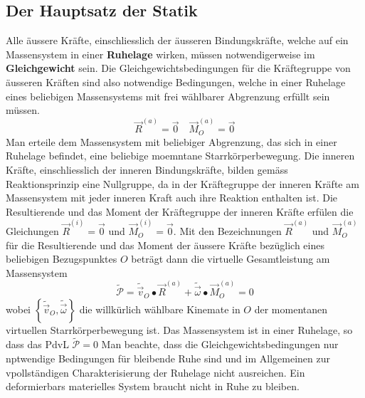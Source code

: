 \subsection{Der Hauptsatz der Statik}
Alle äussere Kräfte, einschliesslich der äusseren Bindungskräfte, welche auf ein Massensystem in einer \textbf{Ruhelage} wirken, müssen notwendigerweise im \textbf{Gleichgewicht} sein. Die Gleichgewichtsbedingungen für die Kräftegruppe von äusseren Kräften sind also notwendige Bedingungen, welche in einer Ruhelage eines beliebigen Massensystems mit frei wählbarer Abgrenzung erfüllt sein müssen.
\begin{equation} 
\boxed{\overrightarrow{R}^{\left(a\right)}=\overrightarrow{0}}\quad \boxed{\overrightarrow{M}_O^{\left(a\right)}=\overrightarrow{0}}
\end{equation} 
Man erteile dem Massensystem mit beliebiger Abgrenzung, das sich in einer Ruhelage befindet, eine beliebige moemntane Starrkörperbewegung. Die inneren Kräfte, einschliesslich der inneren Bindungskräfte, bilden gemäss Reaktionsprinzip eine Nullgruppe, da in der Kräftegruppe der inneren Kräfte am Massensystem mit jeder inneren Kraft auch ihre Reaktion enthalten ist. Die Resultierende und das Moment der Kräftegruppe der inneren Kräfte erfülen die Gleichungen $\overrightarrow{R}^{\left(i\right)}=\overrightarrow{0}$ und $\overrightarrow{M}_O^{\left(i\right)}=\overrightarrow{0}$.
\newline\newline
Mit den Bezeichnungen $\overrightarrow{R}^{\left(a\right)}$ und $\overrightarrow{M}_O^{\left(a\right)}$ für die Resultierende und das Moment der äussere Kräfte bezüglich eines beliebigen Bezugspunktes $O$ beträgt dann die virtuelle Gesamtleistung am Massensystem
\begin{equation} 
\boxed{\tilde{\mathcal{P}}=\tilde{\overrightarrow{v}}_O\bullet \overrightarrow{R}^{\left(a\right)}+\tilde{\overrightarrow{\omega}}\bullet \overrightarrow{M}_O^{\left(a\right)}=0}
\end{equation} 
wobei $\left\{\tilde{\overrightarrow{v}}_O,\tilde{\overrightarrow{\omega}}\right\}$ die willkürlich wählbare Kinemate in $O$ der momentanen virtuellen Starrkörperbewegung ist. Das Massensystem ist in einer Ruhelage, so dass das PdvL $\tilde{\mathcal{P}}=0$
\newline\newline
Man beachte, dass die Gleichgewichtsbedingungen nur nptwendige Bedingungen für bleibende Ruhe sind und im Allgemeinen zur vpollständigen Charakterisierung der Ruhelage nicht ausreichen. Ein deformierbars materielles System braucht nicht in Ruhe zu bleiben.
